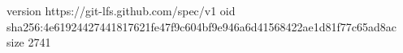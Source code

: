 version https://git-lfs.github.com/spec/v1
oid sha256:4e61924427441817621fe47f9c604bf9e946a6d41568422ae1d81f77c65ad8ac
size 2741
